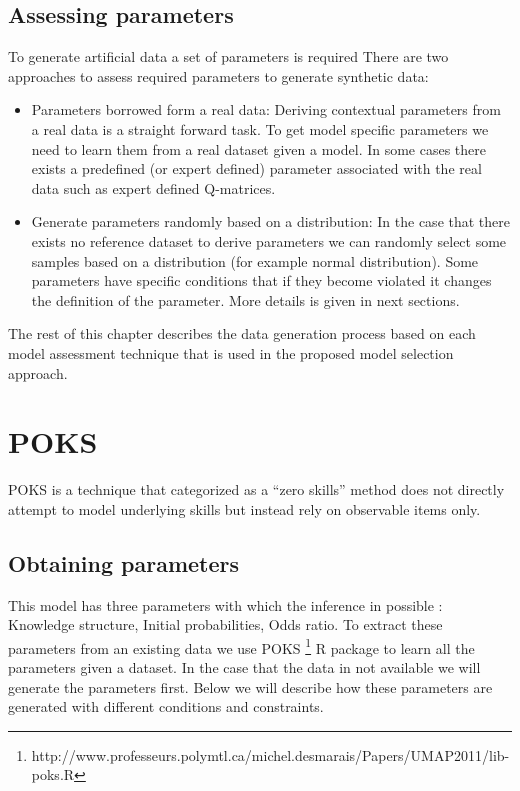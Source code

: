 \subsection{Assessing parameters}

To generate artificial data a set of parameters is required There are two approaches to assess required parameters to generate synthetic data:
\begin{itemize}
\item Parameters borrowed form a real data: Deriving contextual parameters from a real data is a straight forward task. To get model specific parameters we need to learn them from a real dataset given a model. In some cases there exists a predefined (or expert defined) parameter associated with the real data such as expert defined Q-matrices.
\item Generate parameters randomly based on a distribution: In the case that there exists no reference dataset to derive parameters we can randomly select some samples based on a distribution (for example normal distribution). Some parameters have specific conditions that if they become violated it changes the definition of the parameter. More details is given in next sections.

\end{itemize}


The rest of this chapter describes the data generation process based on each model assessment technique that is used in the proposed model selection approach.

\section{POKS}
POKS is a technique that categorized as a ``zero skills'' method does not directly attempt to model underlying skills but instead rely on observable items only. 

\subsection{Obtaining parameters}
This model has three parameters with which the inference in possible : Knowledge structure, Initial probabilities, Odds ratio. To extract these parameters from an existing data we use POKS \footnote{http://www.professeurs.polymtl.ca/michel.desmarais/Papers/UMAP2011/lib-poks.R} R package to learn all the parameters given a dataset. In the case that the data in not available we will generate the parameters first. Below we will describe how these parameters are generated with different conditions and constraints.
